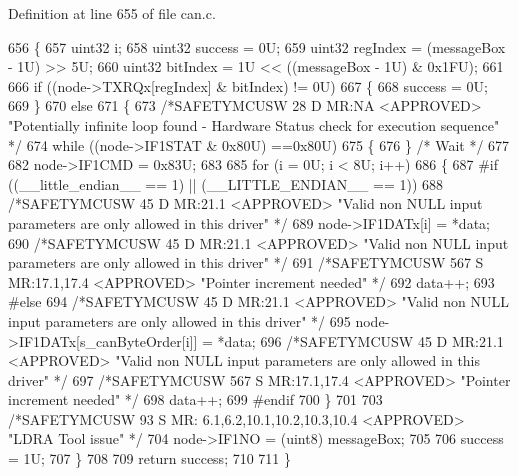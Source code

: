 Definition at line 655 of file can.\+c.


\begin{DoxyCode}
656 \{
657     uint32 i;
658     uint32 success  = 0U;
659     uint32 regIndex = (messageBox - 1U) >> 5U;
660     uint32 bitIndex = 1U << ((messageBox - 1U) & 0x1FU);
661     
666     \textcolor{keywordflow}{if} ((node->TXRQx[regIndex] & bitIndex) != 0U)
667     \{
668         success = 0U;
669     \}
670     \textcolor{keywordflow}{else}
671     \{
673         \textcolor{comment}{/*SAFETYMCUSW 28 D MR:NA <APPROVED> "Potentially infinite loop found - Hardware Status check for
       execution sequence" */}
674         \textcolor{keywordflow}{while} ((node->IF1STAT & 0x80U) ==0x80U)
675         \{ 
676         \} \textcolor{comment}{/* Wait */}
677     
682         node->IF1CMD = 0x83U;
683         
685         \textcolor{keywordflow}{for} (i = 0U; i < 8U; i++)
686         \{
687 \textcolor{preprocessor}{#if ((\_\_little\_endian\_\_ == 1) || (\_\_LITTLE\_ENDIAN\_\_ == 1))
}
688             \textcolor{comment}{/*SAFETYMCUSW 45 D MR:21.1 <APPROVED> "Valid non NULL input parameters are only allowed in this
       driver" */}
689             node->IF1DATx[i] = *data;
690             \textcolor{comment}{/*SAFETYMCUSW 45 D MR:21.1 <APPROVED> "Valid non NULL input parameters are only allowed in this
       driver" */}
691             \textcolor{comment}{/*SAFETYMCUSW 567 S MR:17.1,17.4 <APPROVED> "Pointer increment needed" */}
692             data++;
693 \textcolor{preprocessor}{#else
}
694             \textcolor{comment}{/*SAFETYMCUSW 45 D MR:21.1 <APPROVED> "Valid non NULL input parameters are only allowed in this
       driver" */}
695             node->IF1DATx[s\_canByteOrder[i]] = *data;
696             \textcolor{comment}{/*SAFETYMCUSW 45 D MR:21.1 <APPROVED> "Valid non NULL input parameters are only allowed in this
       driver" */}
697             \textcolor{comment}{/*SAFETYMCUSW 567 S MR:17.1,17.4 <APPROVED> "Pointer increment needed" */}
698             data++;
699 \textcolor{preprocessor}{#endif
}
700         \}
701 
703         \textcolor{comment}{/*SAFETYMCUSW 93 S MR: 6.1,6.2,10.1,10.2,10.3,10.4 <APPROVED> "LDRA Tool issue" */}
704         node->IF1NO = (uint8) messageBox;
705 
706         success = 1U; 
707     \}
708     
709     \textcolor{keywordflow}{return} success;
710     
711 \}
\end{DoxyCode}
\mbox{\label{group__CAN_ga1d9e0b086772f54b215f65962c704b82}} 
